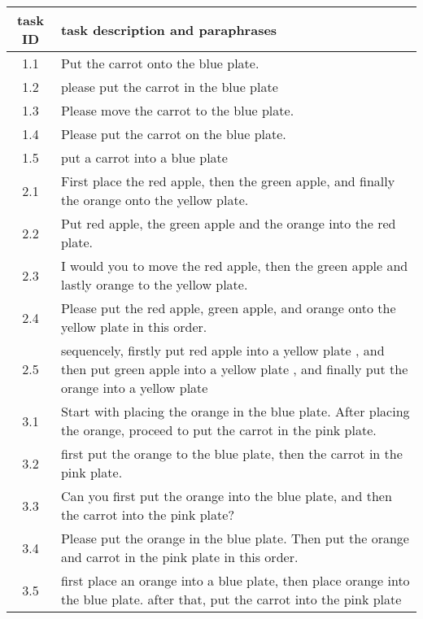 \documentclass{article}
\begin{document}
\begin{table*}[!tbh]
    \centering
    \begin{tabular}{cp{14cm}}
    \toprule
    task ID & { task description and paraphrases} \\
    \hline
       1.1 & Put the carrot onto the blue plate. \\
       1.2 & please put the carrot in the blue plate \\
       1.3 & Please move the carrot to the blue plate. \\
       1.4 & Please put the carrot on the blue plate. \\
       1.5 & put a carrot into a blue plate  \\

       2.1 & First place the red apple, then the green apple, and finally the orange onto the yellow plate. \\
       2.2 & Put red apple, the green apple and the orange into the red plate. \\
       2.3 & I would you to move the red apple, then the green apple and lastly orange to the yellow plate. \\
       2.4 & Please put the red apple, green apple, and orange onto the yellow plate in this order. \\
       2.5 & sequencely, firstly put red apple into a yellow plate , and then put green apple into a yellow plate , and finally put the orange into a yellow plate  \\

       3.1 & Start with placing the orange in the blue plate. After placing the orange, proceed to put the carrot in the pink plate. \\
       3.2 & first put the orange to the blue plate, then the carrot in the pink plate. \\
       3.3 & Can you first put the orange into the blue plate, and then the carrot into the pink plate? \\
       3.4 & Please put the orange in the blue plate. Then put the orange and carrot in the pink plate in this order. \\
       3.5 & first place an orange into a blue plate, then place orange into the blue plate. after that, put the carrot into the pink plate \\


\end{tabular}
\end{table*}
\end{document}
